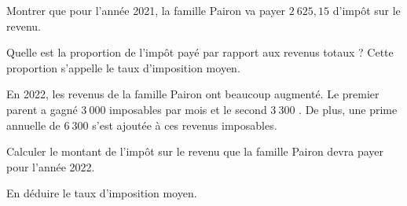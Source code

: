 \documentclass[11pt,a4paper]{article}  %
\begin{document}
\begin{enumMet}
	\item \begin{enumMet}
		\item Montrer que pour l'année 2021, la famille Pairon va payer $2\ 625,15$ \EUR{} d'impôt sur le revenu.
		\item Quelle est la proportion de l'impôt payé par rapport aux revenus totaux ? Cette proportion s'appelle le taux d'imposition moyen.
	\end{enumMet}
	\item En 2022, les revenus de la famille Pairon ont beaucoup augmenté. Le premier parent a gagné $3\ 000$ \EUR{} imposables par mois et le second $3\ 300$ \EUR{}. De plus, une prime annuelle de $6\ 300$ \EUR{} s'est ajoutée à ces revenus imposables.
	\begin{enumMet}
		\item Calculer le montant de l'impôt sur le revenu que la famille Pairon devra payer pour l'année 2022.
		\item En déduire le taux d'imposition moyen.
	\end{enumMet}
\end{enumMet}
\end{document}
